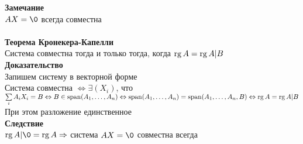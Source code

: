 \documentclass[12pt]{article}
\begin{document}
\textbf{Замечание}\\
$AX=\0$ всегда совместна\\\\
\textbf{Теорема Кронекера-Капелли}\\
Система совместна тогда и только тогда, когда $\operatorname{rg} A = \operatorname{rg} A|B$\\
\textbf{Доказательство}\\
Запишем систему в векторной форме\\
Система совместна $\Leftrightarrow \exists (X_i)$, что $\sum\limits_i A_iX_i=B \Leftrightarrow B \in \operatorname{span}(A_1,\ldots, A_n) \Leftrightarrow \operatorname{span}(A_1,\ldots,A_n) = \operatorname{span}(A_1,\ldots,A_n,B) \Leftrightarrow \operatorname{rg} A = \operatorname{rg} A|B$\\
При этом разложение единственное\\
\textbf{Следствие}\\
$\rg A|\0 = \rg A \Rightarrow$ система $AX=\0$ совместна всегда
\end{document}
